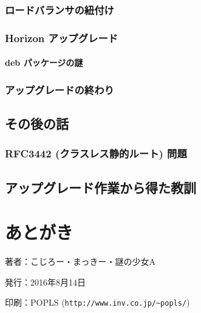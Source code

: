 \documentclass[9pt,b5paper,tombo,openany]{jsbook}
\begin{document}
\subsection{ロードバランサの紐付け}
\subsection{Horizon アップグレード}
\subsubsection{deb パッケージの謎}
\subsection{アップグレードの終わり}

\section{その後の話}
\subsection{RFC3442 (クラスレス静的ルート) 問題}

\section{アップグレード作業から得た教訓}

\chapter{あとがき}

\thispagestyle{empty}
\begin{flushright}
\begin{minipage}{0.5\hsize}
\begin{description}
  \item{著者：}こじろー・まっきー・謎の少女A
  \item{発行：}2016年8月14日
  \item{印刷：}POPLS (\verb|http://www.inv.co.jp/~popls/|)
\end{description}
\end{minipage}
\end{flushright}
\end{document}

